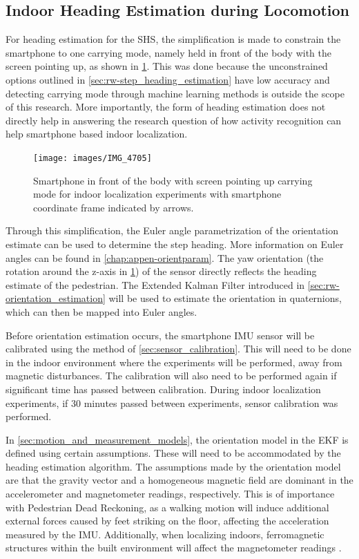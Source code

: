 \newpage
\subsection{Indoor Heading Estimation during Locomotion}
\label{sec:meth-indoor_heading_estimation}
For heading estimation for the \ac{SHS}, the simplification is made to constrain the smartphone to one carrying mode, namely held in front of the body with the screen pointing up, as shown in \cref{fig:experiment_carrying_position}. This was done because the unconstrained options outlined in \cref{sec:rw-step_heading_estimation} have low accuracy and detecting carrying mode through machine learning methods is outside the scope of this research. More importantly, the form of heading estimation does not directly help in answering the research question of how activity recognition can help smartphone based indoor localization. \par 
\begin{figure}[H]
	\centering
	\texttt{[image: images/IMG\_4705]}
	\caption{Smartphone in front of the body with screen pointing up carrying mode for indoor localization experiments with smartphone coordinate frame indicated by arrows.}
	\label{fig:experiment_carrying_position}
\end{figure}
Through this simplification, the Euler angle parametrization of the orientation estimate can be used to determine the step heading. More information on Euler angles can be found in \cref{chap:appen-orientparam}. The yaw orientation (the rotation around the z-axis in \cref{fig:experiment_carrying_position}) of the sensor directly reflects the heading estimate of the pedestrian. The Extended Kalman Filter introduced in \cref{sec:rw-orientation_estimation} will be used to estimate the orientation in quaternions, which can then be mapped into Euler angles. \par 

Before orientation estimation occurs, the smartphone \ac{IMU} sensor will be calibrated using the method of \cref{sec:sensor_calibration}. This will need to be done in the indoor environment where the experiments will be performed, away from magnetic disturbances. The calibration will also need to be performed again if significant time has passed between calibration. During indoor localization experiments, if 30 minutes passed between experiments, sensor calibration was performed.\par 

In \cref{sec:motion_and_measurement_models}, the orientation model in the EKF is defined using certain assumptions. These will need to be accommodated by the heading estimation algorithm.
The assumptions made by the orientation model are that the gravity vector and a homogeneous magnetic field are dominant in the accelerometer and magnetometer readings, respectively. This is of importance with Pedestrian Dead Reckoning, as a walking motion will induce additional external forces caused by feet striking on the floor, affecting the acceleration measured by the IMU. Additionally, when localizing indoors, ferromagnetic structures within the built environment will affect the magnetometer readings \cite{Michel2015a}.\par 

